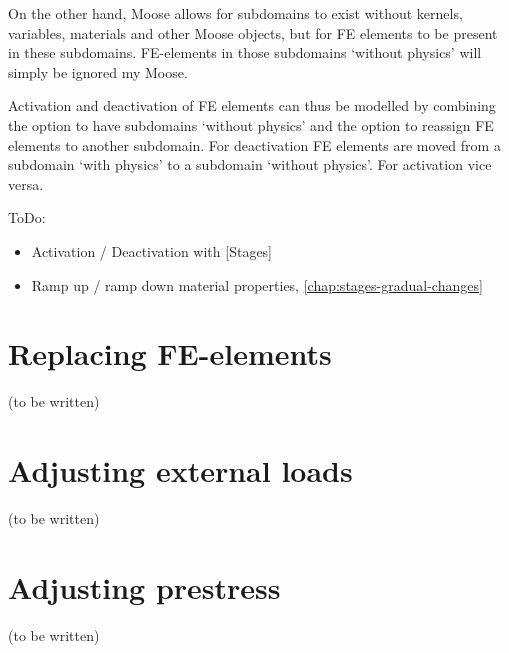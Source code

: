 On the other hand, Moose allows for subdomains to exist without kernels,
variables, materials and other Moose objects, but for FE elements to be present
in these subdomains. FE-elements in those subdomains ‘without physics’ will
simply be ignored my Moose.

Activation and deactivation of FE elements can thus be modelled by combining
the option to have subdomains ‘without physics’ and the option to reassign FE
elements to another subdomain. For deactivation FE elements are moved from a
subdomain ‘with physics’ to a subdomain ‘without physics’. For activation vice
versa.

ToDo:
\begin{itemize}
      \item Activation / Deactivation with [Stages]
      \item Ramp up / ramp down material properties, \autoref{chap:stages-gradual-changes}
\end{itemize}

\section{\todomarker Replacing FE-elements}
\label{chap:stages-element-replacement}

(to be written)

\section{\todomarker Adjusting external loads}
\label{chap:stages-loads}

(to be written)

\section{\todomarker Adjusting prestress}
\label{chap:stages-prestress}

(to be written)